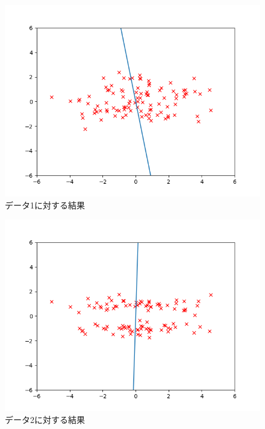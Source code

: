 \documentclass[class=jsarticle, crop=false, dvipdfmx, fleqn]{standalone}
\begin{document}
\begin{figure}[H]
    \centering
    \includegraphics[clip, width=12cm]{../figures/assignment2_result_data1}
    \caption{データ1に対する結果}
    \label{fig:result1}
\end{figure}

\begin{figure}[H]
    \centering
    \includegraphics[clip, width=12cm]{../figures/assignment2_result_data2}
    \caption{データ2に対する結果}
    \label{fig:result2}
\end{figure}
\end{document}

